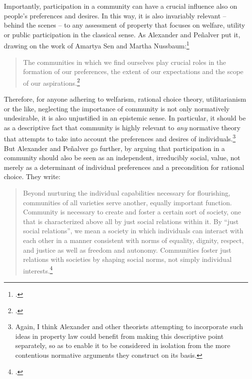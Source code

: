 Importantly, participation in a community can have a crucial influence also on people's preferences and desires. In this way, it is also invariably relevant -- behind the scenes -- to any assessment of property that focuses on welfare, utility or public participation in the classical sense. As Alexander and Pe\~{n}alver put it, drawing on the work of Amartya Sen and Martha Nussbaum:\footcite{sen84,sen85,sen99,nussbaum00,nussbaum02}
\begin{quote}
The communities in which we find ourselves play crucial roles in the formation of our preferences, the extent of our expectations and the scope of our aspirations.\footcite[140]{alexander09}
\end{quote}
Therefore, for anyone adhering to welfarism, rational choice theory, utilitarianism or the like, neglecting the importance of community is not only normatively undesirable, it is also unjustified in an epistemic sense. In particular, it should be  as a descriptive fact that community is highly relevant to {\it any} normative theory that attempts to take into account the preferences and desires of individuals.\footnote{Again, I think Alexander and other theorists attempting to incorporate such ideas in property law could benefit from making this descriptive point separately, so as to enable it to be considered in isolation from the more contentious normative arguments they construct on its basis.} But Alexander and Pe\~{n}alver go further, by arguing that participation in a community should also be seen as an independent, irreducibly social, value, not merely as a determinant of individual preferences and a precondition for rational choice. They write:

\begin{quote}
Beyond nurturing the individual capabilities necessary for flourishing, communities of all varieties serve another, equally important function. Community is necessary to create and foster a certain sort of society, one that is characterized above all by just social relations within it. By ``just social relations'', we mean a society in which individuals can interact with each other in a manner consistent with norms of equality, dignity, respect, and justice as well as freedom and autonomy. Communities foster just relations with societies by shaping social norms, not simply individual interests.\footcite[140]{alexander09}
\end{quote}

